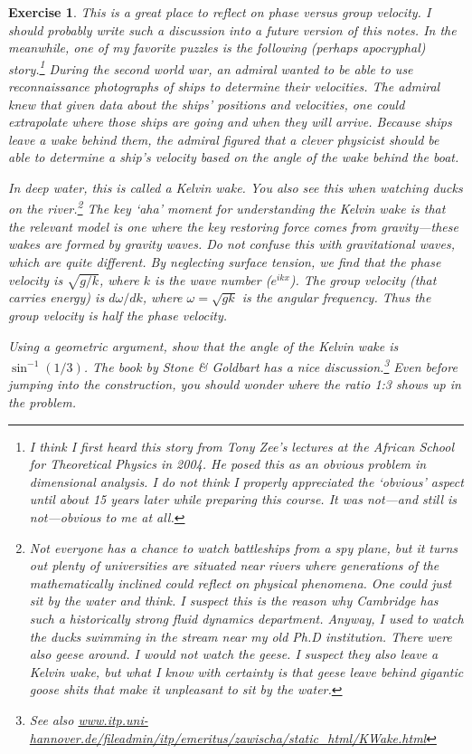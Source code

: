 \documentclass[
  11pt,
	colorful,
	raggedright,
]{tufte-style-thesis-flip}
\newtheorem{exercise}{Exercise}[section]
\begin{document}
\begin{exercise}
This is a great place to reflect on phase versus group velocity. I should probably write such a discussion into a future version of this notes.  In the meanwhile, one of my favorite puzzles is the following (perhaps apocryphal) story.\footnote{I think I first heard this story from Tony Zee's lectures at the African School for Theoretical Physics in 2004. He posed this as an \emph{obvious} problem in dimensional analysis. I do not think I properly appreciated the `obvious' aspect until about 15 years later while preparing this course. It was not---and still is not---obvious to me at all.} During the second world war, an admiral wanted to be able to use reconnaissance photographs of ships to determine their velocities. The admiral knew that given data about the ships' positions and velocities, one could extrapolate where those ships are going and when they will arrive. Because ships leave a wake behind them, the admiral figured that a clever physicist should be able to determine a ship's velocity based on the angle of the wake behind the boat.

In deep water, this is called a Kelvin wake. You also see this when watching ducks on the river.\footnote{Not everyone has a chance to watch battleships from a spy plane, but it turns out plenty of universities are situated near rivers where generations of the mathematically inclined could reflect on physical phenomena. One could just sit by the water and think. I suspect this is the reason why Cambridge has such a historically strong fluid dynamics department. Anyway, I used to watch the ducks swimming in the stream near my old Ph.D institution. There were also geese around. I would not watch the geese. I suspect they also leave a Kelvin wake, but what I know with certainty is that geese leave behind gigantic goose shits that make it unpleasant to sit by the water.} The key `aha' moment for understanding the Kelvin wake is that the relevant model is one where the key restoring force comes from gravity---these wakes are formed by \emph{gravity} waves. Do not confuse this with \emph{gravitational waves}, which are quite different. By neglecting surface tension, we find that the phase velocity is $\sqrt{g/k}$, where $k$ is the wave number ($e^{ikx}$). The group velocity (that carries energy) is $d\omega/dk$, where $\omega=\sqrt{gk}$ is the angular frequency. Thus the group velocity is half the phase velocity. 

Using a geometric argument, show that the angle of the Kelvin wake is $\sin^{-1}(1/3)$. The book by Stone \& Goldbart has a nice discussion.\footnote{See also \url{www.itp.uni-hannover.de/fileadmin/itp/emeritus/zawischa/static_html/KWake.html}} Even before jumping into the construction, you should wonder where the ratio 1:3 shows up in the problem. 
\end{exercise}
\end{document}
